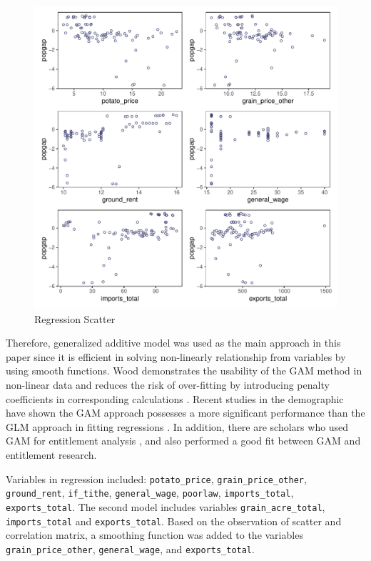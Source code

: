 \begin{figure}[h]
    \centering
    \caption{Regression Scatter}
    \includegraphics[width=.95\textwidth]{../03_outputs/regression_scatter.pdf}
\end{figure}

Therefore, generalized additive model was used as the main approach in this paper since it is efficient in solving non-linearly relationship from variables by using smooth functions. Wood demonstrates the usability of the GAM method in non-linear data and reduces the risk of over-fitting by introducing penalty coefficients in corresponding calculations \citep{wood2001mgcv}. Recent studies in the demographic have shown the GAM approach possesses a more significant performance than the GLM approach in fitting regressions \citep{potts2018evaluation}. In addition, there are scholars who used GAM for entitlement analysis \citep{ardyanto2006granting}, and also performed a good fit between GAM and entitlement research.

Variables in regression included: \texttt{potato\_price}, \texttt{grain\_price\_other}, \texttt{ground\_rent}, \texttt{if\_tithe}, \texttt{general\_wage}, \texttt{poorlaw}, \texttt{imports\_total}, \texttt{exports\_total}. The second model includes variables \texttt{grain\_acre\_total}, \texttt{imports\_total} and \texttt{exports\_total}. Based on the observation of scatter and correlation matrix, a smoothing function was added to the variables \texttt{grain\_price\_other}, \texttt{general\_wage}, and \texttt{exports\_total}. 


